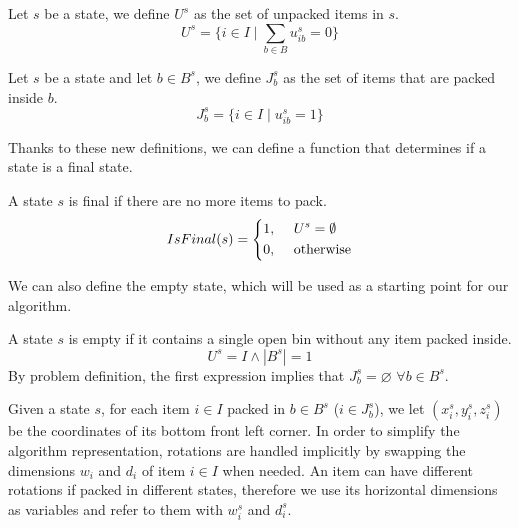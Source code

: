 \begin{definition}
    Let $s$ be a state, we define $U^s$ as the set of unpacked items in $s$.
    \begin{equation*}
        U^s = \{ i \in I \mid \sum_{b \in B} u^{s}_{ib} = 0 \}
    \end{equation*}
\end{definition}

\begin{definition}
    Let $s$ be a state and let $b \in B^s$, we define $J^s_b$ as the set of items that are packed inside $b$.
    \begin{equation*}
        J^s_b = \{ i \in I \mid u^{s}_{ib} = 1 \}
    \end{equation*}
\end{definition}

Thanks to these new definitions, we can define a function that determines if a state is a final state.
\begin{definition}
    \label{def:state_final}
    A state $s$ is final if there are no more items to pack.
    \begin{equation}
        \label{algo:state_final}%
        IsFinal(s) = \left\{\begin{aligned}
            1,\hspace{0.5cm}& U^s = \emptyset \\
            0,\hspace{0.5cm}& \text{otherwise}
        \end{aligned}
        \right.
    \end{equation}
\end{definition}

We can also define the empty state, which will be used as a starting point for our algorithm.
\begin{definition} \label{def:empty_state}
    A state $s$ is empty if it contains a single open bin without any item packed inside.
    \begin{equation*}
        U^s = I \wedge |B^s| = 1
    \end{equation*}
    By problem definition, the first expression implies that $J^s_b = \varnothing$ $\forall b \in B^s$.
\end{definition}

Given a state $s$, for each item $i \in I$ packed in $b \in B^s$ ($i \in J^s_b$), we let $(x^s_i, y^s_i, z^s_i)$ be the coordinates of its bottom front left corner. In order to simplify the algorithm representation, rotations are handled implicitly by swapping the dimensions $w_i$ and $d_i$ of item $i \in I$ when needed. An item can have different rotations if packed in different states, therefore we use its horizontal dimensions as variables and refer to them with $w^s_i$ and $d^s_i$.

